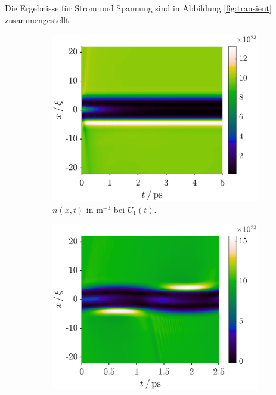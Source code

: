 Die Ergebnisse für Strom und Spannung sind in Abbildung \ref{fig:transient} zusammengestellt.
\begin{figure}
    \centering
    \begin{subfigure}[b]{0.48\textwidth}
        \centering
        \includegraphics[width=\textwidth]{plots/transient/Dichte_sprung.eps}
        \caption[]%
        {{\small $n(x,t)$ in m$^{-3}$ bei $U_1(t)$.}}
    \end{subfigure}
    \hfill
    \begin{subfigure}[b]{0.48\textwidth}
        \centering
        \includegraphics[width=\textwidth]{plots/transient/Dichte_sinus.eps}

\end{subfigure}
\end{figure}
